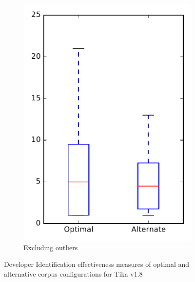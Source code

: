 \begin{figure}
\begin{subfigure}{.4\textwidth}
        \includegraphics[height=0.4\textheight]{figures/combo/dit_rq2_tika_no_outlier}
        \caption{Excluding outliers}\label{fig:combo:dit:rq2:tika_no_outlier}
    \end{subfigure}
\caption{Developer Identification effectiveness measures of optimal and alternative corpus configurations for Tika v1.8}
\label{fig:combo:dit:rq2:tika}
\end{figure}
